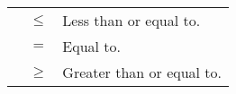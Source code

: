 \begin{listsymbol}
\setlength{\parskip}{12pt}
\setlength{\parindent}{10mm} 
\onehalfspacing
\begin{tabular}{@{}p{10mm}@{}p{2.5cm}@{}p{11.5cm}}
    & $\leq$ & Less than or equal to. \vspace*{3mm} \\
    & $=$    & Equal to. \vspace*{3mm} \\
    & $\geq$ & Greater than or equal to. \vspace*{3mm} \\
\end{tabular}
\end{listsymbol}
